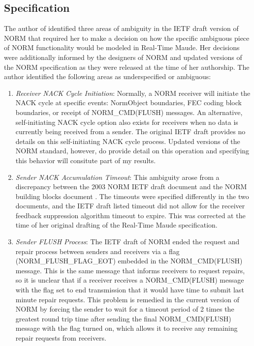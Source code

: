 \documentclass[10pt, journal]{IEEEtran}
\begin{document}
\subsection{Specification}
The author of \cite{Lien2004} identified three areas of ambiguity in the IETF draft version of NORM that required her to make a decision on how the specific ambiguous piece of NORM functionality would be modeled in Real-Time Maude. Her decisions were additionally informed by the designers of NORM and updated versions of the NORM specification as they were released at the time of her authorship. The author identified the following areas as underspecified or ambiguous:
\begin{enumerate}
	\item \textit{Receiver NACK Cycle Initiation}: Normally, a NORM receiver will initiate the NACK cycle at specific events: NormObject boundaries, FEC coding block boundaries, or receipt of NORM\_CMD(FLUSH) messages. An alternative, self-initiating NACK cycle option also exists for receivers when no data is currently being received from a sender. The original IETF draft provides no details on this self-initiating NACK cycle process. Updated versions of the NORM standard, however, do provide detail on this operation and specifying this behavior will consitute part of my results.
	\item \textit{Sender NACK Accumulation Timeout}: This ambiguity arose from a discrepancy between the 2003 NORM IETF draft document and the NORM building blocks document \cite{rfc5401}. The timeouts were specified differently in the two documents, and the IETF draft listed timeout did not allow for the receiver feedback suppression algorithm timeout to expire. This was corrected at the time of her original drafting of the Real-Time Maude specification.
	\item \textit{Sender FLUSH Process}: The IETF draft of NORM ended the request and repair process between senders and receivers via a flag (NORM\_FLUSH\_FLAG\_EOT) embedded in the NORM\_CMD(FLUSH) message. This is the same message that informs receivers to request repairs, so it is unclear that if a receiver receives a NORM\_CMD(FLUSH) message with the flag set to end transmission that it would have time to submit last minute repair requests. This problem is remedied in the current version of NORM by forcing the sender to wait for a timeout period of 2 times the greatest round trip time after sending the final NORM\_CMD(FLUSH) message with the flag turned on, which allows it to receive any remaining repair requests from receivers.
\end{enumerate}
\end{document}
